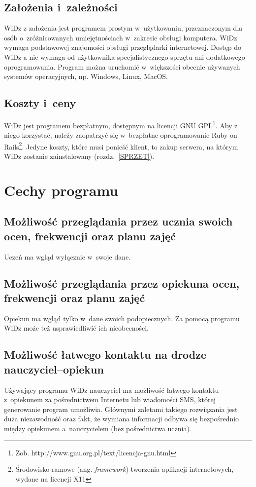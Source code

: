 \documentclass[12pt,leqno,twoside]{mwart}
\begin{document}
\subsection{Założenia i~zależności}
\noindent WiDz z założenia jest programem prostym w~użytkowaniu, przeznaczonym dla osób o~zróżnicowanych umiejętnościach w~zakresie obsługi komputera. WiDz wymaga podstawowej znajomości obsługi przeglądarki internetowej. Dostęp do WiDz-a nie wymaga od użytkownika specjalistycznego sprzętu ani dodatkowego oprogramowania. Program można uruchomić w~większości obecnie używanych systemów operacyjnych, np. Windows, Linux, MacOS.
\subsection{Koszty i~ceny}
\noindent WiDz jest programem bezpłatnym, dostępnym na licencji GNU GPL\footnote{Zob. http://www.gnu.org.pl/text/licencja-gnu.html}. Aby z niego korzystać, należy zaopatrzyć się w~bezpłatne oprogramowanie Ruby on Rails\footnote{Środowisko ramowe (ang. \textit{framework}) tworzenia aplikacji internetowych, wydane na licencji X11}. Jedyne koszty, które musi ponieść klient, to zakup serwera, na którym WiDz zostanie zainstalowany (rozdz.~\ref{SPRZET}).

\section{Cechy programu}
\subsection{Możliwość przeglądania przez ucznia swoich ocen, frekwencji oraz planu zajęć}
\noindent Uczeń ma wgląd wyłącznie w~swoje dane.\\
\subsection{Możliwość przeglądania przez opiekuna ocen, frekwencji oraz planu zajęć}
\noindent Opiekun ma wgląd tylko w~dane swoich podopiecznych. Za pomocą programu WiDz może też usprawiedliwić ich nieobecności.\\
\subsection{Możliwość łatwego kontaktu na drodze nauczyciel--opiekun}
\noindent Używający programu WiDz nauczyciel ma możliwość łatwego kontaktu z~opiekunem za pośrednictwem Internetu lub wiadomości SMS, której generowanie program umożliwia. Głównymi zaletami takiego rozwiązania jest duża niezawodność oraz fakt, że wymiana informacji odbywa się bezpośrednio między opiekunem a~nauczycielem (bez pośrednictwa ucznia).
\end{document}
